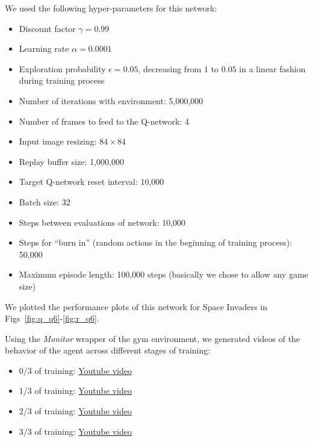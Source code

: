 \documentclass{article}
\begin{document}
We used the following hyper-parameters for this network:
\begin{itemize}
  \item Discount factor $\gamma=0.99$
  \item Learning rate $\alpha=0.0001$
  \item Exploration probability $\epsilon=0.05$, decreasing from $1$ to $0.05$ in a linear fashion during training process
  \item Number of iterations with environment: 5,000,000
  \item Number of frames to feed to the Q-network: 4
  \item Input image resizing: $84\times84$
  \item Replay buffer size: 1,000,000
  \item Target Q-network reset interval: 10,000
  \item Batch size: 32
  \item Steps between evaluations of network: 10,000
  \item Steps for ``burn in'' (random actions in the beginning of training process): 50,000
  \item Maximum episode length: 100,000 steps (basically we chose to allow any game size)
\end{itemize}

We plotted the performance plots of this network for Space Invaders in Figs~\ref{fig:q_q6}-\ref{fig:r_q6}.



Using the \textit{Monitor} wrapper of the gym environment, we generated videos of the behavior of the agent across different stages of training:

\begin{itemize}
  \item 0/3 of training: \href{http://www.sharelatex.com}{Youtube video}
  \item 1/3 of training: \href{http://www.sharelatex.com}{Youtube video}
  \item 2/3 of training: \href{http://www.sharelatex.com}{Youtube video}
  \item 3/3 of training: \href{http://www.sharelatex.com}{Youtube video}
\end{itemize}
\end{document}
